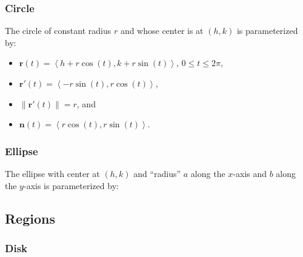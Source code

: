 \documentclass[10pt]{article}
\newcommand{\mb}[1]{\mathbf{#1}}
\newcommand{\brackett}[1]{\left\langle #1 \right\rangle}
\newcommand{\vecfuc}[2]{\mb{#1}(#2)}
\newcommand{\dvecfuc}[2]{\mb{#1}'(#2)}
\newcommand{\normdvecfuc}[2]{\| \mb{#1}'(#2) \|}
\newcommand{\mysqrt}[1]{%
  \mathpalette\foo{#1}%
}
\newcommand{\foo}[2]{%
  \sbox0{$#1\sqrt{#2}$}%
  \begin{tikzpicture}[baseline=(sqrt.base)]
    \node[inner sep=0, outer sep=0] (sqrt) {$#1\sqrt{#2}$}; %
    \draw([yshift=-0.045em]sqrt.north east) -- ++(0,-0.5ex); %
  \end{tikzpicture}%
}
\begin{document}
\subsubsection*{Circle}

The circle of constant radius \(r\) and whose center is at \((h,k)\) is parameterized by:
\begin{itemize}
    \item \(\vecfuc{r}{t} = \brackett{h + r \cos(t), k + r \sin(t)}\), \(0 \leq t \leq 2\pi\),
    \item \(\dvecfuc{r}{t} = \brackett{-r \sin(t), r \cos(t)}\),
    \item \(\normdvecfuc{r}{t} = r\), and
    \item \(\vecfuc{n}{t} = \brackett{r \cos(t), r \sin(t)}\).
\end{itemize}

\subsubsection*{Ellipse}

The ellipse with center at \((h,k)\) and ``radius'' \(a\) along the \(x\)-axis and \(b\) along the \(y\)-axis is parameterized by: 

\newpage

\subsection*{Regions}

\subsubsection*{Disk}
\end{document}
